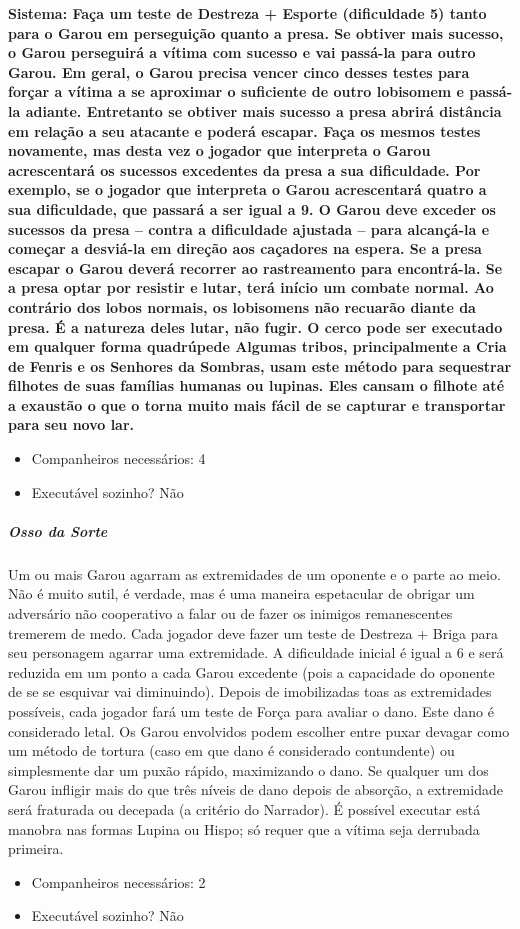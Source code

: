 \begin{multicols}{2}
\bf{Sistema:} Faça um teste de Destreza + Esporte (dificuldade 5) tanto para o Garou em perseguição quanto a presa.  Se obtiver mais sucesso, o Garou perseguirá a vítima com sucesso e vai passá-la para outro Garou. Em geral, o Garou precisa vencer cinco desses testes para forçar a vítima a se aproximar o suficiente de outro lobisomem e passá-la adiante.
Entretanto se obtiver mais sucesso a presa abrirá distância em relação a seu atacante e poderá escapar. Faça os mesmos testes novamente, mas desta vez o jogador que interpreta o Garou acrescentará os sucessos excedentes da presa a sua dificuldade. Por exemplo, se o jogador que interpreta o Garou acrescentará quatro a sua dificuldade, que passará a ser igual a 9. O Garou deve exceder os sucessos da presa – contra a dificuldade ajustada – para alcançá-la e começar a desviá-la em direção aos caçadores na espera. Se a presa escapar o Garou deverá recorrer ao rastreamento para encontrá-la.
Se a presa optar por resistir e lutar, terá início um combate normal.  Ao contrário dos lobos normais, os lobisomens não recuarão diante da presa. É a natureza deles lutar, não fugir.
O cerco pode ser executado em qualquer forma quadrúpede Algumas tribos, principalmente a Cria de Fenris e os Senhores da Sombras, usam este método para sequestrar filhotes de suas famílias humanas ou lupinas. Eles cansam o filhote até a exaustão o que o torna muito mais fácil de se capturar e transportar para seu novo lar.
\begin{itemize}[noitemsep]
\item Companheiros necessários: 4 
\item Executável sozinho? Não
\end{itemize}

\subparagraph{\bf Osso da Sorte}
Um ou mais Garou agarram as extremidades de um oponente e o parte ao meio. Não é muito sutil, é verdade, mas é uma maneira espetacular de obrigar um adversário não cooperativo a falar ou de fazer os inimigos remanescentes tremerem de medo. 
Cada jogador deve fazer um teste de Destreza + Briga para seu personagem agarrar uma extremidade. A dificuldade inicial é igual a 6 e será reduzida em um ponto a cada Garou excedente (pois a capacidade do oponente de se se esquivar vai diminuindo). Depois de imobilizadas toas as extremidades possíveis, cada jogador fará um teste de Força para avaliar o dano. Este dano é considerado letal. Os Garou envolvidos podem escolher entre puxar devagar como um método de tortura (caso em que dano é considerado contundente) ou simplesmente dar um puxão rápido, maximizando o dano. Se qualquer um dos Garou infligir mais do que três níveis de dano depois de absorção, a extremidade será fraturada ou decepada (a critério do Narrador). 
É possível executar está manobra nas formas Lupina ou Hispo; só requer que a vítima seja derrubada primeira. 
\begin{itemize}[noitemsep]
\item Companheiros necessários: 2 
\item Executável sozinho? Não
\end{itemize}


\end{multicols}
